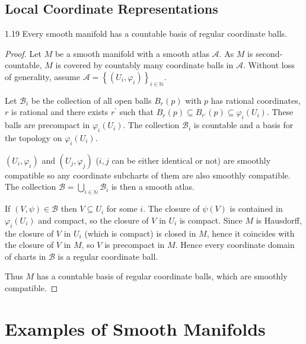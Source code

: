 \subsection{Local Coordinate Representations}

\begin{prop}{1.19}
    Every smooth manifold has a countable basis of regular coordinate balls.
\end{prop}

\begin{proof}
    Let \( M \) be a smooth manifold with a smooth atlas \( \mathcal{A} \). As \( M \) is second-countable, \( M \) is covered by countably many coordinate balls in \( \mathcal{A} \). Without loss of generality, assume \( \mathcal{A} = {\left\{ (U_{i}, \varphi_{i}) \right\}}_{i \in \mathbb{N}} \).

    Let \( \mathcal{B}_{i} \) be the collection of all open balls \( B_{r}(p) \) with \( p \) has rational coordinates, \( r \) is rational and there exists \( r^{\prime} \) such that \( B_{r}(p) \subseteq B_{r^{\prime}}(p) \subseteq \varphi_{i}(U_{i}) \). These balls are precompact in \( \varphi_{i}(U_{i}) \). The collection \( \mathcal{B}_{i} \) is countable and a basis for the topology on \( \varphi_{i}(U_{i}) \).

    \( (U_{i}, \varphi_{i}) \) and \( (U_{j}, \varphi_{j}) \) (\(i, j\) can be either identical or not) are smoothly compatible so any coordinate subcharts of them are also smoothly compatible. The collection \( \mathcal{B} = \bigcup_{i \in \mathbb{N}} \mathcal{B}_{i} \) is then a smooth atlas.

    If \( (V, \psi) \in \mathcal{B} \) then \( V \subseteq U_{i} \) for some \( i \). The closure of \( \psi(V) \) is contained in \( \varphi_{i}(U_{i}) \) and compact, so the closure of \( V \) in \( U_{i} \) is compact. Since \( M \) is Hausdorff, the closure of \( V \) in \( U_{i} \) (which is compact) is closed in \( M \), hence it coincides with the closure of \( V \) in \( M \), so \( V \) is precompact in \( M \). Hence every coordinate domain of charts in \( \mathcal{B} \) is a regular coordinate ball.

    Thus \( M \) has a countable basis of regular coordinate balls, which are smoothly compatible.
\end{proof}

\section{Examples of Smooth Manifolds}

